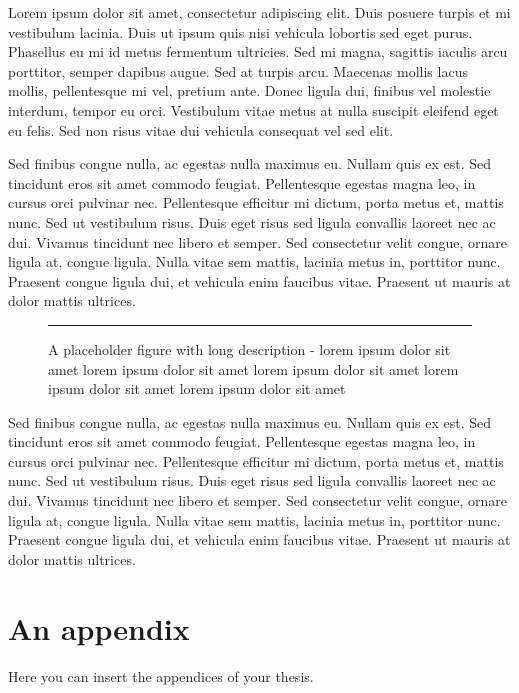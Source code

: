 \documentclass[
  digital,     %
  oneside,     %
  nosansbold,  %
  nocolorbold, %
  lof,         %
  lot,         %
]{fithesis4}
\begin{document}
Lorem ipsum dolor sit amet, consectetur adipiscing elit. Duis posuere turpis et mi vestibulum lacinia. Duis ut ipsum quis nisi vehicula lobortis sed eget purus. Phasellus eu mi id metus fermentum ultricies. Sed mi magna, sagittis iaculis arcu porttitor, semper dapibus augue. Sed at turpis arcu. Maecenas mollis lacus mollis, pellentesque mi vel, pretium ante. Donec ligula dui, finibus vel molestie interdum, tempor eu orci. Vestibulum vitae metus at nulla suscipit eleifend eget eu felis. Sed non risus vitae dui vehicula consequat vel sed elit.

Sed finibus congue nulla, ac egestas nulla maximus eu. Nullam quis ex est. Sed tincidunt eros sit amet commodo feugiat. Pellentesque egestas magna leo, in cursus orci pulvinar nec. Pellentesque efficitur mi dictum, porta metus et, mattis nunc. Sed ut vestibulum risus. Duis eget risus sed ligula convallis laoreet nec ac dui. Vivamus tincidunt nec libero et semper. Sed consectetur velit congue, ornare ligula at, congue ligula. Nulla vitae sem mattis, lacinia metus in, porttitor nunc. Praesent congue ligula dui, et vehicula enim faucibus vitae. Praesent ut mauris at dolor mattis ultrices.

\begin{figure}[ht]
    \centering
    \rule{8cm}{4cm} %
    \caption{A placeholder figure with long description - lorem ipsum dolor sit amet lorem ipsum dolor sit amet lorem ipsum dolor sit amet lorem ipsum dolor sit amet lorem ipsum dolor sit amet}
    \label{fig:example2}
\end{figure}

Sed finibus congue nulla, ac egestas nulla maximus eu. Nullam quis ex est. Sed tincidunt eros sit amet commodo feugiat. Pellentesque egestas magna leo, in cursus orci pulvinar nec. Pellentesque efficitur mi dictum, porta metus et, mattis nunc. Sed ut vestibulum risus. Duis eget risus sed ligula convallis laoreet nec ac dui. Vivamus tincidunt nec libero et semper. Sed consectetur velit congue, ornare ligula at, congue ligula. Nulla vitae sem mattis, lacinia metus in, porttitor nunc. Praesent congue ligula dui, et vehicula enim faucibus vitae. Praesent ut mauris at dolor mattis ultrices.

\printbibliography[heading=bibintoc] %

\appendix %
\chapter{An appendix}
Here you can insert the appendices of your thesis.
\end{document}

